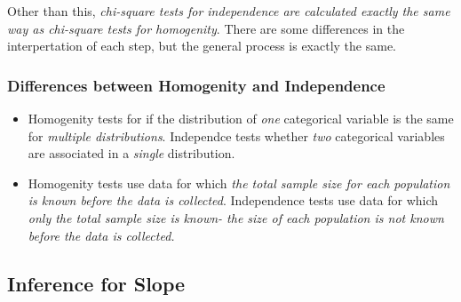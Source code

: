 \documentclass[12pt, a4paper]{article}
\theoremstyle{definition}
\begin{document}
Other than this, \textit{chi-square tests for independence are calculated exactly the same way as chi-square tests for homogenity}.
There are some differences in the interpertation of each step, but the general process is exactly the same.

\subsubsection{Differences between Homogenity and Independence}
\begin{itemize}
    \item Homogenity tests for if the distribution of \textit{one} categorical variable is the same for \textit{multiple distributions}. Independce tests whether \textit{two} categorical variables are associated in a \textit{single} distribution.
    \item Homogenity tests use data for which \textit{the total sample size for each population is known before the data is collected}. Independence tests use data for which \textit{only the total sample size is known- the size of each population is not known before the data is collected.}
\end{itemize}

\subsection{Inference for Slope}
\end{document}
